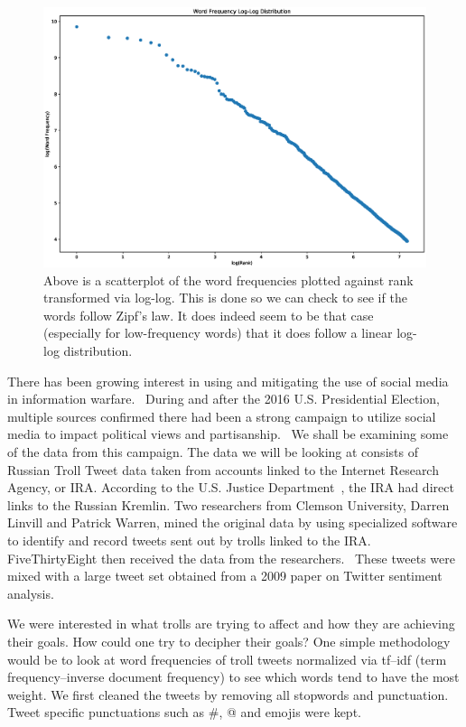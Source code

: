 \documentclass[runningheads]{llncs}
\begin{document}
\begin{figure}
\centering
\includegraphics[scale=.25]{loglog_freq.eps}
\caption{Above is a scatterplot of the word frequencies plotted against rank transformed via log-log. This is done so we can check to see if the words follow Zipf's law. It does indeed seem to be that case (especially for low-frequency words) that it does follow a linear log-log distribution.
} \label{loglog_freq.eps}
\end{figure}

There has been growing interest in using and mitigating the use of social media in information warfare.~\cite{ref_lncs1} During and after the 2016 U.S. Presidential Election, multiple sources confirmed there had been a strong campaign to utilize social media to impact political views and partisanship.~\cite{ref_article1} We shall be examining some of the data from this campaign.
The data we will be looking at consists of Russian Troll Tweet data taken from accounts linked to the Internet Research Agency, or IRA. According to the U.S. Justice Department~\cite{ref_url1}, the IRA had direct links to the Russian Kremlin. Two researchers from Clemson University, Darren Linvill and Patrick Warren, mined the original data by using specialized software to identify and record tweets sent out by trolls linked to the IRA. FiveThirtyEight then received the data from the researchers.~\cite{ref_url4} These tweets were mixed with a large tweet set obtained from a 2009 paper on Twitter sentiment analysis.~\cite{ref_lncs2}



We were interested in what trolls are trying to affect and how they are achieving their goals. How could one try to decipher their goals? One simple methodology would be to look at word frequencies of troll tweets normalized via tf–idf (term frequency–inverse document frequency) to see which words tend to have the most weight.
We first cleaned the tweets by removing all stopwords and punctuation. Tweet specific punctuations such as \#, @ and emojis were kept.
\end{document}

